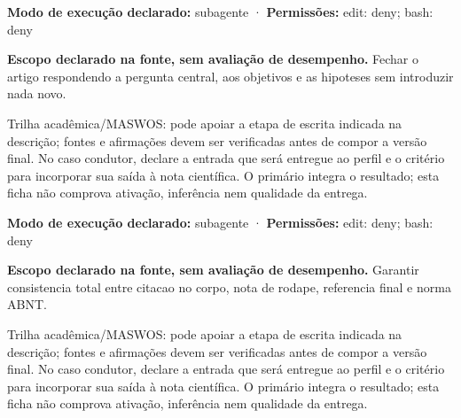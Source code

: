 \begin{arquitetura}
\textbf{Modo de execução declarado:} subagente · \textbf{Permissões:} edit: deny; bash: deny
\end{arquitetura}


\begin{descricao}
\textbf{Escopo declarado na fonte, sem avaliação de desempenho.}
Fechar o artigo respondendo a pergunta central, aos objetivos e as hipoteses sem introduzir nada novo.
\end{descricao}

\begin{funcao}
Trilha acadêmica/MASWOS: pode apoiar a etapa de escrita indicada na descrição; fontes e afirmações devem ser verificadas antes de compor a versão final. No caso condutor, declare a entrada que será entregue ao perfil e o critério para incorporar sua saída à nota científica. O primário integra o resultado; esta ficha não comprova ativação, inferência nem qualidade da entrega.
\end{funcao}

\begin{arquitetura}
\textbf{Modo de execução declarado:} subagente · \textbf{Permissões:} edit: deny; bash: deny
\end{arquitetura}


\begin{descricao}
\textbf{Escopo declarado na fonte, sem avaliação de desempenho.}
Garantir consistencia total entre citacao no corpo, nota de rodape, referencia final e norma ABNT.
\end{descricao}

\begin{funcao}
Trilha acadêmica/MASWOS: pode apoiar a etapa de escrita indicada na descrição; fontes e afirmações devem ser verificadas antes de compor a versão final. No caso condutor, declare a entrada que será entregue ao perfil e o critério para incorporar sua saída à nota científica. O primário integra o resultado; esta ficha não comprova ativação, inferência nem qualidade da entrega.
\end{funcao}

